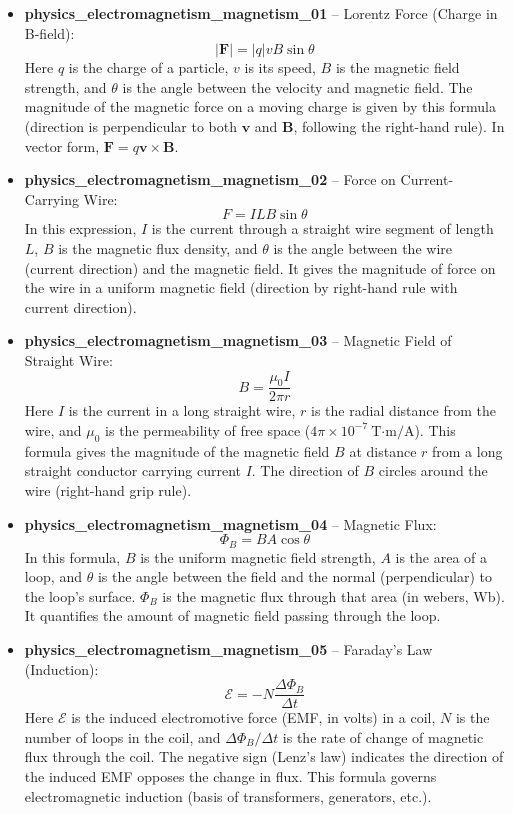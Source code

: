 \documentclass[11pt,a4paper]{article}
\begin{document}
\begin{itemize}
\item \textbf{physics\_electromagnetism\_magnetism\_01} -- Lorentz Force (Charge in B-field): 
\[|\mathbf{F}| = |q|vB\sin\theta\]
Here $q$ is the charge of a particle, $v$ is its speed, $B$ is the magnetic field strength, and $\theta$ is the angle between the velocity and magnetic field. The magnitude of the magnetic force on a moving charge is given by this formula (direction is perpendicular to both $\mathbf{v}$ and $\mathbf{B}$, following the right-hand rule). In vector form, $\mathbf{F} = q\mathbf{v} \times \mathbf{B}$.

\item \textbf{physics\_electromagnetism\_magnetism\_02} -- Force on Current-Carrying Wire: 
\[F = ILB\sin\theta\]
In this expression, $I$ is the current through a straight wire segment of length $L$, $B$ is the magnetic flux density, and $\theta$ is the angle between the wire (current direction) and the magnetic field. It gives the magnitude of force on the wire in a uniform magnetic field (direction by right-hand rule with current direction).

\item \textbf{physics\_electromagnetism\_magnetism\_03} -- Magnetic Field of Straight Wire: 
\[B = \frac{\mu_0 I}{2\pi r}\]
Here $I$ is the current in a long straight wire, $r$ is the radial distance from the wire, and $\mu_0$ is the permeability of free space ($4\pi \times 10^{-7}\ \text{T·m/A}$). This formula gives the magnitude of the magnetic field $B$ at distance $r$ from a long straight conductor carrying current $I$. The direction of $B$ circles around the wire (right-hand grip rule).

\item \textbf{physics\_electromagnetism\_magnetism\_04} -- Magnetic Flux: 
\[\Phi_B = BA\cos\theta\]
In this formula, $B$ is the uniform magnetic field strength, $A$ is the area of a loop, and $\theta$ is the angle between the field and the normal (perpendicular) to the loop's surface. $\Phi_B$ is the magnetic flux through that area (in webers, Wb). It quantifies the amount of magnetic field passing through the loop.

\item \textbf{physics\_electromagnetism\_magnetism\_05} -- Faraday's Law (Induction): 
\[\mathcal{E} = -N\frac{\Delta \Phi_B}{\Delta t}\]
Here $\mathcal{E}$ is the induced electromotive force (EMF, in volts) in a coil, $N$ is the number of loops in the coil, and $\Delta \Phi_B/\Delta t$ is the rate of change of magnetic flux through the coil. The negative sign (Lenz's law) indicates the direction of the induced EMF opposes the change in flux. This formula governs electromagnetic induction (basis of transformers, generators, etc.).


\end{itemize}
\end{document}

